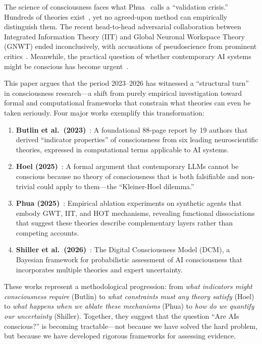 The science of consciousness faces what Phua~\citep{phua2025} calls a ``validation crisis.'' Hundreds of theories exist~\citep{kuhn2024landscape}, yet no agreed-upon method can empirically distinguish them. The recent head-to-head adversarial collaboration between Integrated Information Theory (IIT) and Global Neuronal Workspace Theory (GNWT) ended inconclusively, with accusations of pseudoscience from prominent critics~\citep{fleming2023pseudoscience, tononi2025paradigms}. Meanwhile, the practical question of whether contemporary AI systems might be conscious has become urgent~\citep{sebo2025moral, birch2024precautionary}.

This paper argues that the period 2023--2026 has witnessed a ``structural turn''~\citep{kleiner2024structural} in consciousness research---a shift from purely empirical investigation toward formal and computational frameworks that constrain what theories can even be taken seriously. Four major works exemplify this transformation:

\begin{enumerate}[leftmargin=*]
    \item \textbf{Butlin et al.\ (2023)}~\citep{butlin2023consciousness}: A foundational 88-page report by 19 authors that derived ``indicator properties'' of consciousness from six leading neuroscientific theories, expressed in computational terms applicable to AI systems.

    \item \textbf{Hoel (2025)}~\citep{hoel2025disproof}: A formal argument that contemporary LLMs cannot be conscious because no theory of consciousness that is both falsifiable and non-trivial could apply to them---the ``Kleiner-Hoel dilemma.''

    \item \textbf{Phua (2025)}~\citep{phua2025}: Empirical ablation experiments on synthetic agents that embody GWT, IIT, and HOT mechanisms, revealing functional dissociations that suggest these theories describe complementary layers rather than competing accounts.

    \item \textbf{Shiller et al.\ (2026)}~\citep{shiller2026dcm}: The Digital Consciousness Model (DCM), a Bayesian framework for probabilistic assessment of AI consciousness that incorporates multiple theories and expert uncertainty.
\end{enumerate}

These works represent a methodological progression: from \emph{what indicators might consciousness require} (Butlin) to \emph{what constraints must any theory satisfy} (Hoel) to \emph{what happens when we ablate these mechanisms} (Phua) to \emph{how do we quantify our uncertainty} (Shiller). Together, they suggest that the question ``Are AIs conscious?'' is becoming tractable---not because we have solved the hard problem, but because we have developed rigorous frameworks for assessing evidence.

